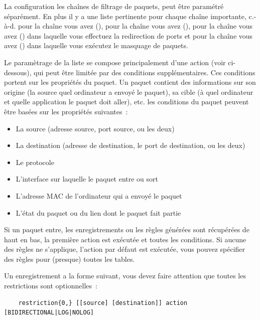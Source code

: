   La configuration les chaînes de filtrage de paquets, peut être paramétré
  séparément. En plus il y a une liste pertinente pour chaque chaîne importante,
  c.-à-d. pour la chaîne  vous avez (), pour
  la chaîne  vous avez (), pour la chaîne
   vous avez () dans laquelle vous
  effectuez la redirection de ports et pour la chaîne  vous
  avez () dans laquelle vous exécutez le masquage
  de paquets.

  Le paramètrage de la liste se compose principalement d'une action (voir
  ci-dessous), qui peut être limitée par des conditions supplémentaires. Ces
  conditions portent sur les propriétés du paquet. Un paquet contient des
  informations sur son origine (la source quel ordinateur a envoyé le paquet),
  sa cible (à quel ordinateur et quelle application le paquet doit aller), etc.
  les conditions du paquet peuvent être basées sur les propriétés suivantes~:

\begin{itemize}
  \item La source (adresse source, port source, ou les deux)
  \item La destination (adresse de destination, le port de destination, ou les deux)
  \item Le protocole
  \item L'interface sur laquelle le paquet entre ou sort
  \item L'adresse MAC de l'ordinateur qui a envoyé le paquet
  \item L'état du paquet ou du lien dont le paquet fait partie
\end{itemize}

  Si un paquet entre, les enregistrements ou les règles générées sont récupérées
  de haut en bas, la première action est exécutée et toutes les conditions. Si
  aucune des règles ne s'applique, l'action par défaut est exécutée, vous pouvez
  spécifier des règles pour (presque) toutes les tables.

  Un enregistrement a la forme suivant, vous devez faire attention que toutes
  les restrictions sont optionnelles~:

\begin{example}
\begin{verbatim}
    restriction{0,} [[source] [destination]] action [BIDIRECTIONAL|LOG|NOLOG]
\end{verbatim}
\end{example}

